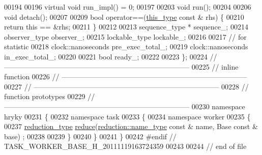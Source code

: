 \begin{DoxyCode}
00194     
00196     \textcolor{keyword}{virtual} \textcolor{keywordtype}{void} run\_impl() = 0;
00197 
00203     \textcolor{keywordtype}{void} run();
00204 
00206     \textcolor{keywordtype}{void} detach();
00207 
00209     \textcolor{keywordtype}{bool} operator==(\hyperlink{classhryky_1_1task_1_1worker_1_1_base_a7e479f64d3081afe38ac8c001c784b6f}{this_type} \textcolor{keyword}{const} & rhs) \{
00210         \textcolor{keywordflow}{return} \textcolor{keyword}{this} == &rhs;
00211     \}
00212 
00213     sequence\_type *             sequence\_;
00214     observer\_type               observer\_;
00215     lockable\_type               lockable\_;
00216 
00217     \textcolor{comment}{// for statistic}
00218     clock::nanoseconds          pre\_exec\_total\_;
00219     clock::nanoseconds          in\_exec\_total\_;
00220     
00221     \textcolor{keywordtype}{bool}                        ready\_;
00222     
00223 \};
00224 \textcolor{comment}{//
      ------------------------------------------------------------------------------}
00225 \textcolor{comment}{// inline function}
00226 \textcolor{comment}{//
      ------------------------------------------------------------------------------}
00227 \textcolor{comment}{//
      ------------------------------------------------------------------------------}
00228 \textcolor{comment}{// function prototypes}
00229 \textcolor{comment}{//
      ------------------------------------------------------------------------------}
00230 \textcolor{keyword}{namespace }hryky
00231 \{
00232 \textcolor{keyword}{namespace }task
00233 \{
00234 \textcolor{keyword}{namespace }worker
00235 \{
00237     \hyperlink{namespacehryky_a343a9a4c36a586be5c2693156200eadc}{reduction_type} \hyperlink{namespacehryky_1_1task_1_1worker_a69f40c48f750e5d2a8b867f295119dac}{reduce}(\hyperlink{namespacehryky_1_1reduction_ac686c30a4c8d196bbd0f05629a6b921f}{reduction::name_type} \textcolor{keyword}{const} & name, Base \textcolor{keyword}{const} & base)
      ;
00238 
00239 \}
00240 \}
00241 \}
00242 \textcolor{preprocessor}{#endif // TASK\_WORKER\_BASE\_H\_20111119163724359}
00243 \textcolor{preprocessor}{}
00244 \textcolor{comment}{// end of file}
\end{DoxyCode}
